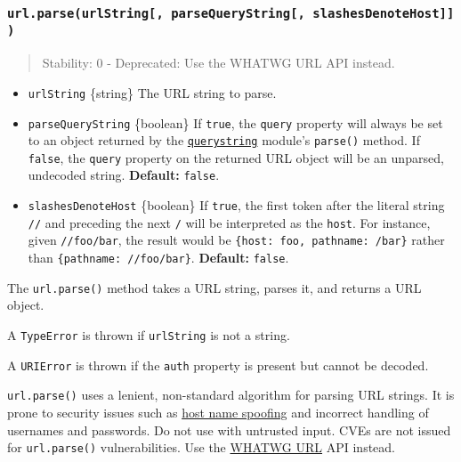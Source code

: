 \subsubsection{\texorpdfstring{\texttt{url.parse(urlString{[},\ parseQueryString{[},\ slashesDenoteHost{]}{]})}}{url.parse(urlString{[}, parseQueryString{[}, slashesDenoteHost{]}{]})}}\label{url.parseurlstring-parsequerystring-slashesdenotehost}

\begin{quote}
Stability: 0 - Deprecated: Use the WHATWG URL API instead.
\end{quote}

\begin{itemize}
\tightlist
\item
  \texttt{urlString} \{string\} The URL string to parse.
\item
  \texttt{parseQueryString} \{boolean\} If \texttt{true}, the
  \texttt{query} property will always be set to an object returned by
  the \href{querystring.md}{\texttt{querystring}} module's
  \texttt{parse()} method. If \texttt{false}, the \texttt{query}
  property on the returned URL object will be an unparsed, undecoded
  string. \textbf{Default:} \texttt{false}.
\item
  \texttt{slashesDenoteHost} \{boolean\} If \texttt{true}, the first
  token after the literal string \texttt{//} and preceding the next
  \texttt{/} will be interpreted as the \texttt{host}. For instance,
  given \texttt{//foo/bar}, the result would be
  \texttt{\{host:\ \textquotesingle{}foo\textquotesingle{},\ pathname:\ \textquotesingle{}/bar\textquotesingle{}\}}
  rather than
  \texttt{\{pathname:\ \textquotesingle{}//foo/bar\textquotesingle{}\}}.
  \textbf{Default:} \texttt{false}.
\end{itemize}

The \texttt{url.parse()} method takes a URL string, parses it, and
returns a URL object.

A \texttt{TypeError} is thrown if \texttt{urlString} is not a string.

A \texttt{URIError} is thrown if the \texttt{auth} property is present
but cannot be decoded.

\texttt{url.parse()} uses a lenient, non-standard algorithm for parsing
URL strings. It is prone to security issues such as
\href{https://hackerone.com/reports/678487}{host name spoofing} and
incorrect handling of usernames and passwords. Do not use with untrusted
input. CVEs are not issued for \texttt{url.parse()} vulnerabilities. Use
the \hyperref[the-whatwg-url-api]{WHATWG URL} API instead.

